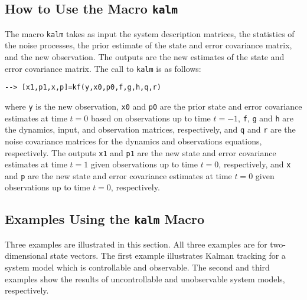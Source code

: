 

\subsection{How to Use the Macro {\tt kalm}}

	The macro {\tt kalm} takes as input the system description
matrices, the statistics of the noise processes, the prior estimate of 
the state and error covariance matrix, and the new observation.  The
outputs are the new estimates of the state and error covariance
matrix.  The call to {\tt kalm} is as follows:
\begin{verbatim}
--> [x1,p1,x,p]=kf(y,x0,p0,f,g,h,q,r)
\end{verbatim}
where {\tt y} is the new observation, {\tt x0} and {\tt p0} are the
prior state and error covariance estimates at time $t=0$ based on observations
up to time $t=-1$, {\tt f}, {\tt g} and {\tt h} are
the dynamics, input, and observation matrices, respectively, and {\tt q} 
and {\tt r} are the noise covariance matrices for the dynamics and
observations equations, respectively.  The outputs {\tt x1} and {\tt p1}
are the new state and error covariance estimates at time $t=1$ given
observations up to time $t=0$, respectively, and {\tt x} and {\tt p}
are the new state and error covariance estimates at time $t=0$ given
observations up to time $t=0$, respectively.

\subsection{Examples Using the {\tt kalm} Macro}

	Three examples are illustrated in this section.  All three
examples are for two-dimensional state vectors.  The first example
illustrates Kalman tracking for a system model which is controllable
and observable.  The second and third examples show the results of
uncontrollable and unobservable system models, respectively. 

